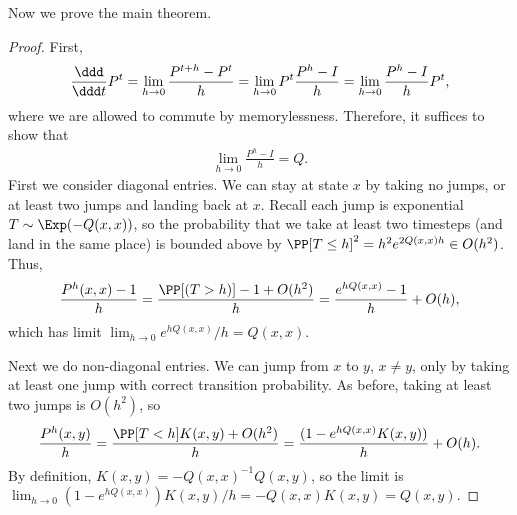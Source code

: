 Now we prove the main theorem.
\begin{proof}
First, 
\begin{align*}
	\frac{\ddd}{\ddd t} P^t = \lim_{h\rightarrow 0}\frac{P^{t+h} - P^t}{h} = \lim_{h\rightarrow 0} P^t\frac{P^h - I}{h} = \lim_{h\rightarrow 0} \frac{P^h - I}{h}P^t,
\end{align*}
where we are allowed to commute by memorylessness. Therefore, it suffices to show that 
\begin{align*}
	\lim_{h\rightarrow 0}\frac{P^h-I}{h} = Q.
\end{align*}
First we consider diagonal entries. We can stay at state $x$ by taking no jumps, or at least two jumps and landing back at $x$. Recall each jump is exponential $T\sim \Exp(-Q(x,x))$, so the probability that we take at least two timesteps (and land in the same place) is bounded above by $\PP[T\leq h]^2 = h^2e^{2Q(x,x)h}\in O(h^2)$. Thus,
\[\frac{P^h(x,x) - 1}{h} = \frac{\PP[(T > h)] - 1 + O(h^2)}{h} = \frac{e^{hQ(x,x)} - 1}{h} + O(h),\]
which has limit $\lim_{h\rightarrow 0}e^{hQ(x,x)}/h = Q(x,x)$. 

Next we do non-diagonal entries. We can jump from $x$ to $y$, $x\neq y$, only by taking at least one jump with correct transition probability. As before, taking at least two jumps is $O(h^2)$, so
\[\frac{P^h(x,y)}{h} = \frac{\PP[T < h]K(x,y) + O(h^2)}{h} = \frac{(1-e^{hQ(x,x)}K(x,y))}{h} + O(h).\]
By definition, $K(x,y) = -Q(x,x)^{-1}Q(x,y)$, so the limit is $\lim_{h\rightarrow 0}(1-e^{hQ(x,x)})K(x,y)/h = -Q(x,x)K(x,y) = Q(x,y)$. 
\end{proof}


